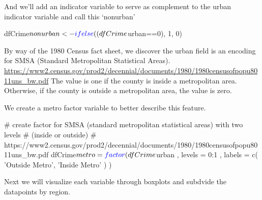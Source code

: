 \documentclass[]{article}
\newenvironment{Shaded}{}{}
\newcommand{\CommentTok}[1]{\textcolor[rgb]{0.00,0.50,0.00}{#1}}
\newcommand{\DataTypeTok}[1]{#1}
\newcommand{\DecValTok}[1]{#1}
\newcommand{\KeywordTok}[1]{\textcolor[rgb]{0.00,0.00,1.00}{#1}}
\newcommand{\NormalTok}[1]{#1}
\newcommand{\OperatorTok}[1]{#1}
\newcommand{\StringTok}[1]{\textcolor[rgb]{0.00,0.50,0.50}{#1}}
\begin{document}
And we'll add an indicator variable to serve as complement to the urban
indicator variable and call this `nonurban'

\begin{Shaded}
\begin{Highlighting}[]
\NormalTok{dfCrime}\OperatorTok{$}\NormalTok{nonurban <-}\StringTok{ }\KeywordTok{ifelse}\NormalTok{((dfCrime}\OperatorTok{$}\NormalTok{urban}\OperatorTok{==}\DecValTok{0}\NormalTok{), }\DecValTok{1}\NormalTok{, }\DecValTok{0}\NormalTok{)}
\end{Highlighting}
\end{Shaded}

By way of the 1980 Census fact sheet, we discover the urban field is an
encoding for SMSA (Standard Metropolitan Statistical Areas).
\url{https://www2.census.gov/prod2/decennial/documents/1980/1980censusofpopu8011uns_bw.pdf}
The value is one if the county is inside a metropolitan area. Otherwise,
if the county is outside a metropolitan area, the value is zero.

We create a metro factor variable to better describe this feature.

\begin{Shaded}
\begin{Highlighting}[]
\CommentTok{# create factor for SMSA (standard metropolitan statistical areas) with two levels }
\CommentTok{# (inside or outside)}
\CommentTok{#    https://www2.census.gov/prod2/decennial/documents/1980/1980censusofpopu8011uns_bw.pdf}
\NormalTok{dfCrime}\OperatorTok{$}\NormalTok{metro =}
\StringTok{            }\KeywordTok{factor}\NormalTok{( dfCrime}\OperatorTok{$}\NormalTok{urban , }\DataTypeTok{levels =} \DecValTok{0}\OperatorTok{:}\DecValTok{1}\NormalTok{ , }\DataTypeTok{labels =}
                    \KeywordTok{c}\NormalTok{( }\StringTok{'Outside Metro'}\NormalTok{,}
                       \StringTok{'Inside Metro'}
\NormalTok{                      )}
\NormalTok{                   )}
\end{Highlighting}
\end{Shaded}

Next we will visualize each variable through boxplots and subdvide the
datapoints by region.
\end{document}
